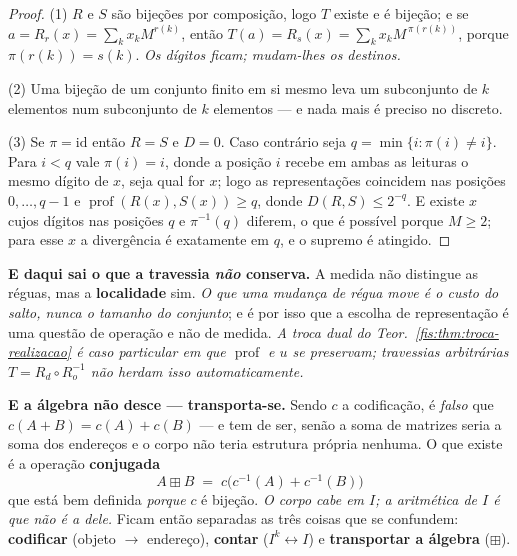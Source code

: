 \documentclass[livro.tex]{subfiles}
\begin{document}
\begin{proof}
(1) $R$ e $S$ são bijeções por composição, logo $T$ existe e é bijeção; e se
$a=R_r(x)=\sum_k x_k M^{r(k)}$, então $T(a)=R_s(x)=\sum_k x_k M^{\,\pi(r(k))}$,
porque $\pi(r(k))=s(k)$. \emph{Os dígitos ficam; mudam-lhes os destinos.}

(2) Uma bijeção de um conjunto finito em si mesmo leva um subconjunto de $k$
elementos num subconjunto de $k$ elementos --- e nada mais é preciso no discreto.

(3) Se $\pi=\mathrm{id}$ então $R=S$ e $D=0$. Caso contrário seja
$q=\min\{i:\pi(i)\neq i\}$. Para $i<q$ vale $\pi(i)=i$, donde a posição $i$
recebe em ambas as leituras o mesmo dígito de $x$, seja qual for $x$; logo as
representações coincidem nas posições $0,\dots,q-1$ e
$\operatorname{prof}(R(x),S(x))\ge q$, donde $D(R,S)\le2^{-q}$. E existe $x$ cujos
dígitos nas posições $q$ e $\pi^{-1}(q)$ diferem, o que é possível porque
$M\ge2$; para esse $x$ a divergência é exatamente em $q$, e o supremo é atingido.
\end{proof}

\medskip\noindent\textbf{E daqui sai o que a travessia \emph{não} conserva.} A
medida não distingue as réguas, mas a \textbf{localidade} sim. \emph{O que uma
mudança de régua move é o custo do salto, nunca o tamanho do conjunto}; e é por
isso que a escolha de representação é uma questão de operação e não de medida.
\emph{A troca dual do Teor.~\ref{fis:thm:troca-realizacao} é caso particular em
que $\operatorname{prof}$ e $u$ se preservam; travessias arbitrárias $T=R_d\circ
R_o^{-1}$ não herdam isso automaticamente.}

\medskip\noindent\textbf{E a álgebra não desce --- transporta-se.} Sendo $c$ a
codificação, é \emph{falso} que $c(A+B)=c(A)+c(B)$ --- e tem de ser, senão a soma
de matrizes seria a soma dos endereços e o corpo não teria estrutura própria
nenhuma. O que existe é a operação \textbf{conjugada}
\[
\boxed{\;A\boxplus B \;=\; c\bigl(c^{-1}(A)+c^{-1}(B)\bigr)\;}
\]
que está bem definida \emph{porque} $c$ é bijeção. \emph{O corpo cabe em $I$; a
aritmética de $I$ é que não é a dele.} Ficam então separadas as três coisas que
se confundem: \textbf{codificar} (objeto $\to$ endereço), \textbf{contar}
($I^{k}\leftrightarrow I$) e \textbf{transportar a álgebra} ($\boxplus$).
\end{document}
